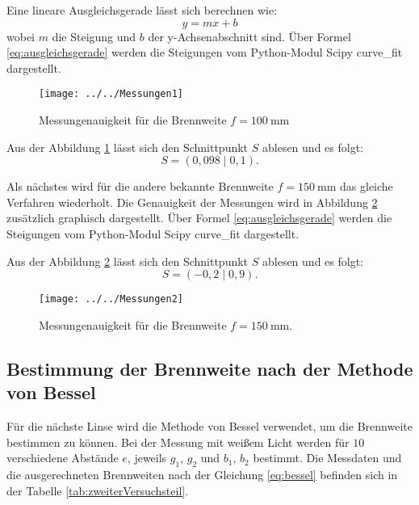 Eine lineare Ausgleichsgerade lässt sich berechnen wie:
\begin{equation}
\label{eq:ausgleichsgerade}
y = mx + b
\end{equation}
wobei $m$ die Steigung und $b$ der y-Achsenabschnitt sind. Über Formel \ref{eq:ausgleichsgerade} werden die Steigungen vom Python-Modul Scipy curve\_fit dargestellt.

\begin{figure}[h!]
	\centering
	\texttt{[image: ../../Messungen1]}
	\caption{Messungenauigkeit für die Brennweite $f= \SI{100}{\milli\meter}$}
	\label{fig:messungen1}
\end{figure}

Aus der Abbildung \ref{fig:messungen1} lässt sich den Schnittpunkt $S$ ablesen und es folgt:
\begin{equation*}
S = (0,098 \mid 0,1).
\end{equation*}

Als nächstes wird für die andere bekannte Brennweite $f = \SI{150}{\milli\meter}$ das gleiche Verfahren wiederholt. Die Genauigkeit der Messungen wird in Abbildung \ref{fig:messungen2} zusätzlich graphisch dargestellt. Über Formel \ref{eq:ausgleichsgerade} werden die Steigungen vom Python-Modul Scipy curve\_fit dargestellt.

Aus der Abbildung \ref{fig:messungen2} lässt sich den Schnittpunkt $S$ ablesen und es folgt:
\begin{equation*}
S = (-0,2 \mid 0,9).
\end{equation*}

\begin{figure}[h!]
	\centering
	\texttt{[image: ../../Messungen2]}
	\caption{Messungenauigkeit für die Brennweite $f= \SI{150}{\milli\meter}$.}
	\label{fig:messungen2}
\end{figure}

\subsection{Bestimmung der Brennweite nach der Methode von Bessel}
Für die nächste Linse wird die Methode von Bessel verwendet, um die Brennweite bestimmen zu können. Bei der Messung mit weißem Licht werden für $10$ verschiedene Abstände $e$, jeweils $g_1$, $g_2$ und $b_1$, $b_2$ bestimmt. Die Messdaten und die ausgerechneten Brennweiten nach der Gleichung \ref{eq:bessel} befinden sich in der Tabelle \ref{tab:zweiterVersuchsteil}.

